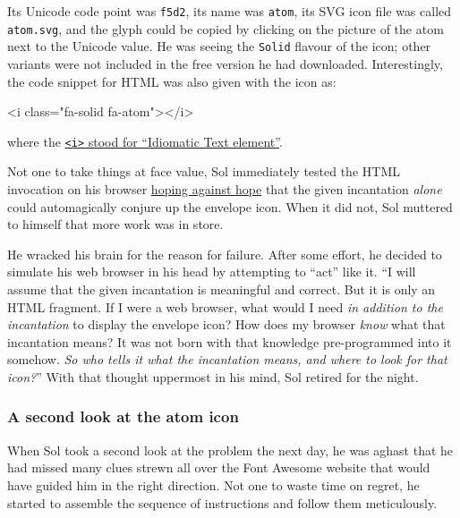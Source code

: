 \documentclass[
  british,
  a4paper,
  rgb,
  dvipsnames,
  svgnames,
  hyphens]{article}
\newenvironment{Shaded}{\begin{snugshade}}{\end{snugshade}}
\newcommand{\ErrorTok}[1]{\textcolor[rgb]{0.76,0.75,0.62}{#1}}
\newcommand{\KeywordTok}[1]{\textcolor[rgb]{0.94,0.87,0.69}{#1}}
\newcommand{\OtherTok}[1]{\textcolor[rgb]{0.94,0.94,0.56}{#1}}
\newcommand{\StringTok}[1]{\textcolor[rgb]{0.80,0.58,0.58}{#1}}
\begin{document}
Its Unicode code point was \texttt{f5d2}, its name was \texttt{atom},
its SVG icon file was called \texttt{atom.svg}, and the glyph could be
copied by clicking on the picture of the atom next to the Unicode value.
He was seeing the \texttt{Solid} flavour of the icon; other variants
were not included in the free version he had downloaded. Interestingly,
the code snippet for HTML was also given with the icon as:

\begin{Shaded}
\begin{Highlighting}[]
\KeywordTok{\textless{}i} \ErrorTok{class}\OtherTok{=}\StringTok{"fa{-}solid fa{-}atom"}\KeywordTok{\textgreater{}\textless{}/i\textgreater{}}
\end{Highlighting}
\end{Shaded}

where the
\href{https://developer.mozilla.org/en-US/docs/Web/HTML/Element/i}{\texttt{\textless{}i\textgreater{}}
stood for ``Idiomatic Text element''}.

Not one to take things at face value, Sol immediately tested the HTML
invocation on his browser
\href{https://www.thefreedictionary.com/hoping+against+hope}{hoping
against hope} that the given incantation \emph{alone} could
automagically conjure up the envelope icon. When it did not, Sol
muttered to himself that more work was in store.

He wracked his brain for the reason for failure. After some effort, he
decided to simulate his web browser in his head by attempting to ``act''
like it. ``I will assume that the given incantation is meaningful and
correct. But it is only an HTML fragment. If I were a web browser, what
would I need \emph{in addition to the incantation} to display the
envelope icon? How does my browser \emph{know} what that incantation
means? It was not born with that knowledge pre-programmed into it
somehow. \emph{So who tells it what the incantation means, and where to
look for that icon?}'' With that thought uppermost in his mind, Sol
retired for the night.

\hypertarget{a-second-look-at-the-atom-icon}{%
\subsubsection{A second look at the atom
icon}\label{a-second-look-at-the-atom-icon}}

When Sol took a second look at the problem the next day, he was aghast
that he had missed many clues strewn all over the Font Awesome website
that would have guided him in the right direction. Not one to waste time
on regret, he started to assemble the sequence of instructions and
follow them meticulously.
\end{document}
